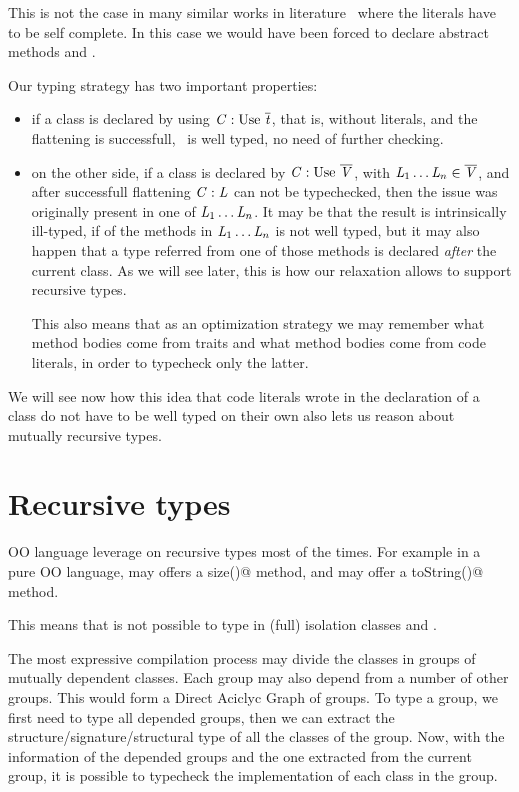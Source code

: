 This is not the case in many similar works in literature~\cite{} where the
literals have to be self complete. In this case we would have been forced to
declare abstract methods \Q@n@ and \Q@m@.

Our typing strategy has two important properties:
\begin{itemize}
\item if a class is declared by using $\mC : \use\ \overline\mt$, that is, without literals,
and the flattening is successfull, \mC\ is well typed, no need of further checking.
\item on the other side, if a class is declared by $\mC : \use\ \overline\mV$, with
$\mathit{L}_1\ldots\mathit{L}_n \in \overline{\mathit{V}}$, and after successfull flattening $\mathit{C} : \mathit{L}$ can not be typechecked,
then the issue was originally present in one of $\mathit{L}_1\ldots\mathit{L}_n$.
It may be that the result is intrinsically ill-typed, if of the methods in $\mathit{L}_1\ldots\mathit{L}_n$ is not well typed,
but it may also happen that a type referred from one of those methods is declared \emph{after} the current class. As we will see later, this is how our relaxation allows to support recursive types.

This also means that as an optimization strategy
 we may remember what method bodies come from traits and what method bodies come from code literals, in order to typecheck only the latter.
 \end{itemize}

We will see now how this idea that code literals wrote in the declaration of a class
do not have to be well typed on their own also lets us reason about mutually recursive types.

 \section{Recursive types}

OO language leverage on recursive types most of the times.
For example in a pure OO language, \Q@String@ may offers a \Q@Int size()@
method, and \Q@Int@ may offer a \Q@String toString()@ method.

This means that is not possible to type in (full) isolation classes
\Q@String@ and \Q@Int@.

The most expressive compilation process may divide the classes in groups of mutually 
dependent classes.
Each group may also depend from a number of other groups.
This would form a Direct Aciclyc Graph of groups.
To type a group, we first need to type all depended groups, then
we can extract the structure/signature/structural type of all
the classes of the group.
Now, with the information of the depended groups and the one extracted
from the current group, it is possible to typecheck the implementation
 of each class in the group.

